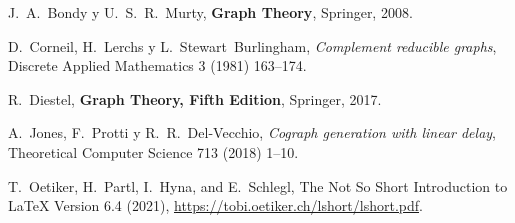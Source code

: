 \begin{thebibliography}{99}

  J.~A.~Bondy y U.~S.~R.~Murty,
  \textbf{Graph Theory},
  Springer, 2008.

  D.~Corneil, H.~Lerchs y L.~Stewart~Burlingham,
  \textit{Complement reducible graphs},
  Discrete Applied Mathematics 3 (1981) 163--174.

  R.~Diestel,
  \textbf{Graph Theory, Fifth Edition},
  Springer, 2017.

  A.~Jones, F.~Protti y R.~R.~Del-Vecchio,
  \textit{Cograph generation with linear delay},
  Theoretical Computer Science 713 (2018) 1--10.

  T.~Oetiker, H.~Partl, I.~Hyna, and E.~Schlegl,
  The Not So Short Introduction to \LaTeX{} Version 6.4 (2021),
  \href{https://tobi.oetiker.ch/lshort/lshort.pdf}{%
  https://tobi.oetiker.ch/lshort/lshort.pdf}.

\end{thebibliography}
